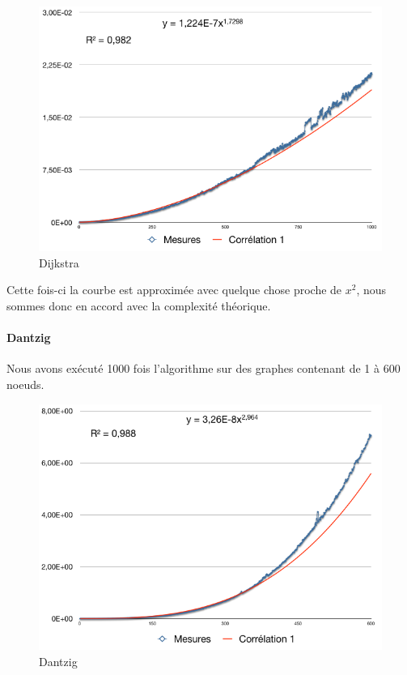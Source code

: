 \documentclass[a4paper,12pt,final] {article}
\begin{document}
\begin{figure}[htpd]
\begin{center}
\includegraphics[scale=0.4]{dijkstra}
\end{center}
\caption{Dijkstra}
\end{figure}

Cette fois-ci la courbe est approximée avec quelque chose proche de $x^{2}$, nous sommes donc en accord avec la complexité théorique.
\paragraph{Dantzig}
Nous avons exécuté 1000 fois l'algorithme sur des graphes contenant de 1 à 600 noeuds.

\begin{figure}[htpd]
\begin{center}
\includegraphics[scale=0.4]{dantzig}
\end{center}
\caption{Dantzig}
\end{figure}
\end{document}
